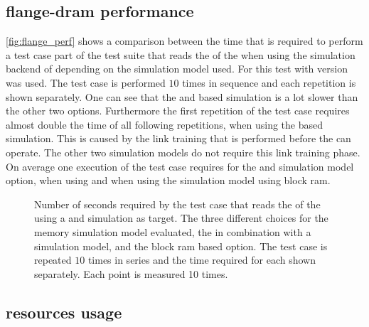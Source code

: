 \subsection{flange-dram performance}
\autoref{fig:flange_perf} shows a comparison between the time that is required to perform a test case part of the \hxcomm{} test suite that reads the \JTAGID{} of the \ASIC{} when using the simulation backend of \hxcomm{} depending on the \AXI{} \DDR{} simulation model used. For this test \xcelium{} with version \xceliumVer{} was used. The test case is performed $\num{10}$ times in sequence and each repetition is shown separately. One can see that the \XilinxMIG{} and \DDR{} based simulation is a lot slower than the other two options. Furthermore the first repetition of the test case requires almost double the time of all following repetitions, when using the \XilinxMIG{} based simulation. This is caused by the link training that is performed before the \XilinxMIG{} can operate. The other two simulation models do not require this link training phase. On average one execution of the test case requires  for the \XilinxMIG{} and \DDR{} simulation model option,  when using \flangedram{} and  when using the simulation model using block ram.


\begin{figure}[H]
\caption{Number of seconds required by the \hxcomm{} test case that reads the \JTAGID{} of the \ASIC{} using a \FPGA{} and \ASIC{} simulation as target. The three different choices for the \AXI{} \DDR{} memory simulation model evaluated, the \XilinxMIG{} in combination with a \DDR{} simulation model, \flangedram{} and the block ram based option. The \hxcomm{} test case is repeated $\num{10}$ times in series and the time required for each shown separately. Each point is measured 10 times.}\label{fig:flange_perf}
\end{figure}

\subsection{\FPGA{} resources usage}

